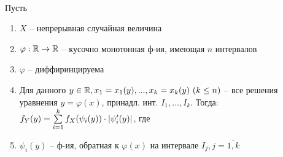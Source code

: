 ~

\THRM Пусть
\begin{enumerate}[topsep=0pt, leftmargin=20pt, noitemsep]
	\item $X$ -- непрерывная случайная величина
	
	\item $\varphi:\mathbb{R}\rightarrow\mathbb{R}$ -- кусочно монотонная ф-ия, имеющая $n$ интервалов
	
	\item $\varphi$ -- диффиринцируема
	
	\item Для данного $y\in\mathbb{R},x_1=x_1(y),...,x_k=x_k(y)~(k\leq n)$ -- все решения уравнения $y=\varphi(x)$, принадл. инт. $I_1,...,I_k$. Тогда: $f_Y(y)=\sum\limits_{i=1}^k f_X(\psi_i(y))\cdot|\psi'_i(y)|$, где
	\item [] $\psi_i(y)$ -- ф-ия, обратная к $\varphi(x)$ на интервале $I_j,j=\overline{1,k}$
\end{enumerate}

\clearpage
